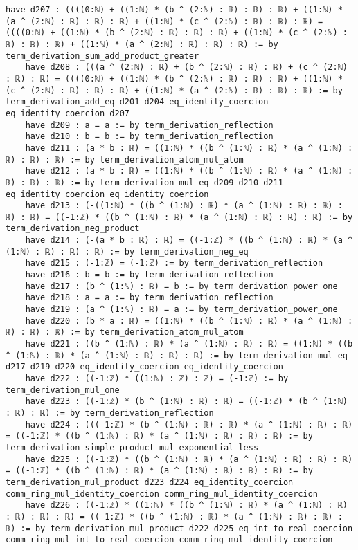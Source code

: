 \documentclass{article}
\begin{document}
\begin{tcolorbox}[colback=white!10, width=\linewidth]
\begin{lstlisting}[language=Lean4]
    have d207 : ((((0:ℕ) + ((1:ℕ) * (b ^ (2:ℕ) : ℝ) : ℝ) : ℝ) + ((1:ℕ) * (a ^ (2:ℕ) : ℝ) : ℝ) : ℝ) + ((1:ℕ) * (c ^ (2:ℕ) : ℝ) : ℝ) : ℝ) = ((((0:ℕ) + ((1:ℕ) * (b ^ (2:ℕ) : ℝ) : ℝ) : ℝ) + ((1:ℕ) * (c ^ (2:ℕ) : ℝ) : ℝ) : ℝ) + ((1:ℕ) * (a ^ (2:ℕ) : ℝ) : ℝ) : ℝ) := by term_derivation_sum_add_product_greater
    have d208 : (((a ^ (2:ℕ) : ℝ) + (b ^ (2:ℕ) : ℝ) : ℝ) + (c ^ (2:ℕ) : ℝ) : ℝ) = ((((0:ℕ) + ((1:ℕ) * (b ^ (2:ℕ) : ℝ) : ℝ) : ℝ) + ((1:ℕ) * (c ^ (2:ℕ) : ℝ) : ℝ) : ℝ) + ((1:ℕ) * (a ^ (2:ℕ) : ℝ) : ℝ) : ℝ) := by term_derivation_add_eq d201 d204 eq_identity_coercion eq_identity_coercion d207
    have d209 : a = a := by term_derivation_reflection
    have d210 : b = b := by term_derivation_reflection
    have d211 : (a * b : ℝ) = ((1:ℕ) * ((b ^ (1:ℕ) : ℝ) * (a ^ (1:ℕ) : ℝ) : ℝ) : ℝ) := by term_derivation_atom_mul_atom
    have d212 : (a * b : ℝ) = ((1:ℕ) * ((b ^ (1:ℕ) : ℝ) * (a ^ (1:ℕ) : ℝ) : ℝ) : ℝ) := by term_derivation_mul_eq d209 d210 d211 eq_identity_coercion eq_identity_coercion
    have d213 : (-((1:ℕ) * ((b ^ (1:ℕ) : ℝ) * (a ^ (1:ℕ) : ℝ) : ℝ) : ℝ) : ℝ) = ((-1:ℤ) * ((b ^ (1:ℕ) : ℝ) * (a ^ (1:ℕ) : ℝ) : ℝ) : ℝ) := by term_derivation_neg_product
    have d214 : (-(a * b : ℝ) : ℝ) = ((-1:ℤ) * ((b ^ (1:ℕ) : ℝ) * (a ^ (1:ℕ) : ℝ) : ℝ) : ℝ) := by term_derivation_neg_eq
    have d215 : (-1:ℤ) = (-1:ℤ) := by term_derivation_reflection
    have d216 : b = b := by term_derivation_reflection
    have d217 : (b ^ (1:ℕ) : ℝ) = b := by term_derivation_power_one
    have d218 : a = a := by term_derivation_reflection
    have d219 : (a ^ (1:ℕ) : ℝ) = a := by term_derivation_power_one
    have d220 : (b * a : ℝ) = ((1:ℕ) * ((b ^ (1:ℕ) : ℝ) * (a ^ (1:ℕ) : ℝ) : ℝ) : ℝ) := by term_derivation_atom_mul_atom
    have d221 : ((b ^ (1:ℕ) : ℝ) * (a ^ (1:ℕ) : ℝ) : ℝ) = ((1:ℕ) * ((b ^ (1:ℕ) : ℝ) * (a ^ (1:ℕ) : ℝ) : ℝ) : ℝ) := by term_derivation_mul_eq d217 d219 d220 eq_identity_coercion eq_identity_coercion
    have d222 : ((-1:ℤ) * ((1:ℕ) : ℤ) : ℤ) = (-1:ℤ) := by term_derivation_mul_one
    have d223 : ((-1:ℤ) * (b ^ (1:ℕ) : ℝ) : ℝ) = ((-1:ℤ) * (b ^ (1:ℕ) : ℝ) : ℝ) := by term_derivation_reflection
    have d224 : (((-1:ℤ) * (b ^ (1:ℕ) : ℝ) : ℝ) * (a ^ (1:ℕ) : ℝ) : ℝ) = ((-1:ℤ) * ((b ^ (1:ℕ) : ℝ) * (a ^ (1:ℕ) : ℝ) : ℝ) : ℝ) := by term_derivation_simple_product_mul_exponential_less
    have d225 : ((-1:ℤ) * ((b ^ (1:ℕ) : ℝ) * (a ^ (1:ℕ) : ℝ) : ℝ) : ℝ) = ((-1:ℤ) * ((b ^ (1:ℕ) : ℝ) * (a ^ (1:ℕ) : ℝ) : ℝ) : ℝ) := by term_derivation_mul_product d223 d224 eq_identity_coercion comm_ring_mul_identity_coercion comm_ring_mul_identity_coercion
    have d226 : ((-1:ℤ) * ((1:ℕ) * ((b ^ (1:ℕ) : ℝ) * (a ^ (1:ℕ) : ℝ) : ℝ) : ℝ) : ℝ) = ((-1:ℤ) * ((b ^ (1:ℕ) : ℝ) * (a ^ (1:ℕ) : ℝ) : ℝ) : ℝ) := by term_derivation_mul_product d222 d225 eq_int_to_real_coercion comm_ring_mul_int_to_real_coercion comm_ring_mul_identity_coercion

\end{lstlisting}
\end{tcolorbox}
\end{document}
